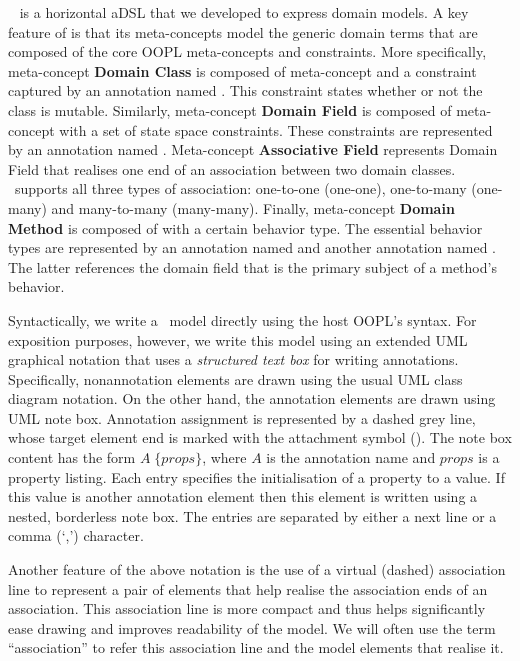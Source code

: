 ~\cite{le_domain_2018} is a horizontal aDSL that we developed to express domain models.
A key feature of  is that its meta-concepts model the generic domain terms that are composed of the core OOPL meta-concepts and constraints. More specifically, meta-concept \textbf{Domain Class} is composed of meta-concept  and a constraint captured by an annotation named . This constraint states whether or not the class is mutable. Similarly, meta-concept \textbf{Domain Field} is composed of meta-concept  with a set of state space constraints. 
These constraints are represented by an annotation named . 
Meta-concept \textbf{Associative Field} represents Domain Field that realises one end of an association between two domain classes. \dcsl~supports all three types of association: one-to-one (\abbr one-one), one-to-many (\abbr one-many) and many-to-many (\abbr many-many). 
Finally, meta-concept \textbf{Domain Method} is composed of  with a certain behavior type. The essential behavior types are represented by an annotation named  and another annotation named . The latter references the domain field that is the primary subject of a method's behavior.

Syntactically, we write a \dcsl~model directly using the host OOPL's syntax. For exposition purposes, however, we write this model using an extended UML graphical notation that uses a \textit{structured text box} for writing annotations. Specifically, nonannotation elements are drawn using the usual UML class diagram notation. On the other hand, the annotation elements are drawn using UML note box. Annotation assignment is represented by a dashed grey line, whose target element end is marked with the attachment symbol (\drawFilledRect[gray]{0.15cm}{0.15cm}). The note box content has the form $ A \; \{ props \} $, where $ A $ is the annotation name and $ props $ is a property listing. Each entry specifies the initialisation of a property to a value. If this value is another annotation element then this element is written using a nested, borderless note box. The entries are separated by either a next line or a comma (`,') character.

Another feature of the above notation is the use of a virtual (dashed) association line to represent a pair of  elements that help realise the association ends of an association. This association line is more compact and thus helps significantly ease drawing and improves readability of the model. 
We will often use the term ``association'' to refer this association line and the  model elements that realise it.

